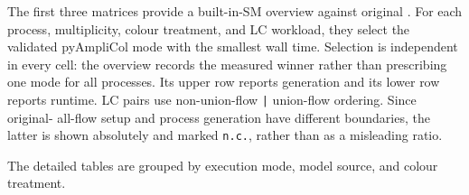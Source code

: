 The first three matrices provide a built-in-SM overview against original
\AC{}.  For each process, multiplicity, colour treatment, and LC workload,
they select the validated pyAmpliCol mode with the smallest wall time.
Selection is independent in every cell: the overview records the measured
winner rather than prescribing one mode for all processes.  Its upper row
reports generation and its lower row reports runtime.  LC pairs use
non-union-flow \texttt{|} union-flow ordering.  Since original-\AC{} all-flow
setup and \PAC{} process generation have different boundaries, the latter is
shown absolutely and marked \texttt{n.c.}, rather than as a misleading ratio.





The detailed tables are grouped by execution mode, model source, and colour
treatment.













